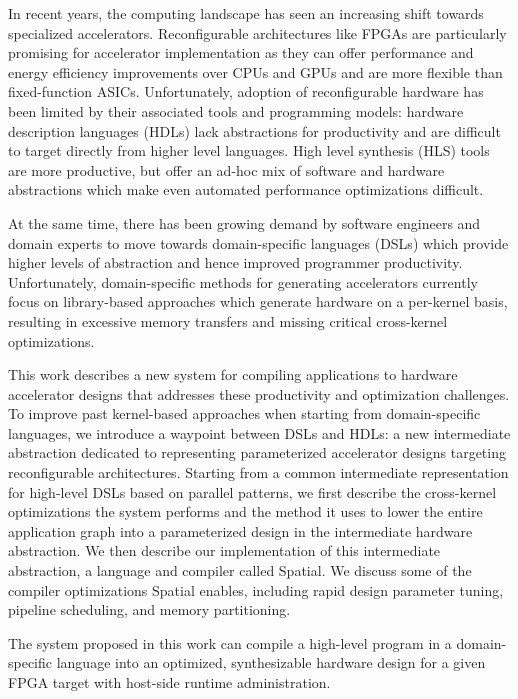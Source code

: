 In recent years, the computing landscape has seen an increasing shift towards
specialized accelerators. Reconfigurable architectures like FPGAs are
particularly promising for accelerator implementation as they can offer
performance and energy efficiency improvements over CPUs and GPUs and are more
flexible than fixed-function ASICs. Unfortunately, adoption of reconfigurable
hardware has been limited by their associated tools and programming models:
hardware description languages (HDLs) lack abstractions for productivity and are
difficult to target directly from higher level languages. High level synthesis
(HLS) tools are more productive, but offer an ad-hoc mix of software and hardware
abstractions which make even automated performance optimizations difficult.

At the same time, there has been growing demand by software engineers
and domain experts to move towards domain-specific languages (DSLs)
which provide higher levels of abstraction and hence improved programmer
productivity.
Unfortunately, domain-specific methods for generating accelerators currently
focus on library-based approaches which generate
hardware on a per-kernel basis, resulting in excessive memory transfers and
missing critical cross-kernel optimizations.

This work describes a new system for compiling applications to hardware
accelerator designs that addresses these productivity and optimization
challenges. To improve past kernel-based
approaches when starting from domain-specific languages, we
introduce a waypoint between DSLs and HDLs: a new intermediate abstraction
dedicated to representing parameterized accelerator designs
targeting reconfigurable architectures.
Starting from a common intermediate
representation for high-level DSLs based on parallel patterns, we first describe
the cross-kernel optimizations the system performs and the method it uses to
lower the entire application graph into a parameterized design in the
intermediate hardware abstraction.
We then describe our implementation of
this intermediate abstraction, a language and compiler called Spatial.
We discuss some of the compiler optimizations Spatial enables,
including rapid design parameter tuning, pipeline scheduling, and 
memory partitioning.

The system proposed in this work can compile a
high-level program in a domain-specific language into an optimized,
synthesizable hardware design for a
given FPGA target with host-side runtime administration.


